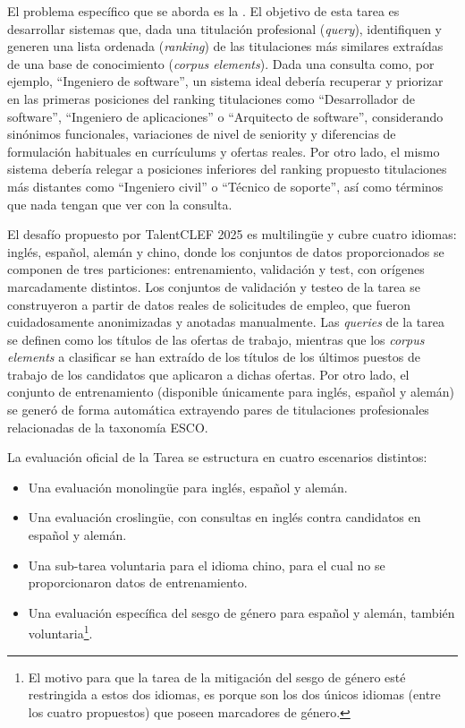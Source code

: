 El problema específico que se aborda es  la . El objetivo de esta tarea es desarrollar sistemas que, dada una titulación profesional (\textit{query}), identifiquen y generen una lista ordenada (\textit{ranking}) de las titulaciones más similares extraídas de una base de conocimiento (\textit{corpus elements}). Dada una consulta como, por ejemplo, ``Ingeniero de software'', un sistema ideal debería recuperar y priorizar en las primeras posiciones del ranking titulaciones como ``Desarrollador de software'', ``Ingeniero de aplicaciones'' o ``Arquitecto de software'', considerando sinónimos funcionales, variaciones de nivel de seniority y diferencias de formulación habituales en currículums y ofertas reales. Por otro lado, el mismo sistema debería relegar a posiciones inferiores del ranking propuesto titulaciones más distantes como ``Ingeniero civil'' o ``Técnico de soporte'', así como términos que nada tengan que ver con la consulta.

El desafío propuesto por TalentCLEF 2025 es multilingüe y cubre cuatro idiomas: inglés, español, alemán y chino, donde los conjuntos de datos proporcionados se componen de tres particiones: entrenamiento, validación y test, con orígenes marcadamente distintos. Los conjuntos de validación y testeo de la tarea se construyeron a partir de datos reales de solicitudes de empleo, que fueron cuidadosamente anonimizadas y anotadas manualmente. Las \textit{queries} de la tarea se definen como los títulos de las ofertas de trabajo, mientras que los \textit{corpus elements} a clasificar se han extraído de los títulos de los últimos puestos de trabajo de los candidatos que aplicaron a dichas ofertas. Por otro lado, el conjunto de entrenamiento (disponible únicamente para inglés, español y alemán) se generó de forma automática extrayendo pares de titulaciones profesionales relacionadas de la taxonomía \gls{ESCO}.

La evaluación oficial de la \gls{Tarea} se estructura en cuatro escenarios distintos:

\begin{itemize}
    \item Una evaluación monolingüe para inglés, español y alemán.
    \item Una evaluación croslingüe, con consultas en inglés contra candidatos en español y alemán.
    \item Una sub-tarea voluntaria para el idioma chino, para el cual no se proporcionaron datos de entrenamiento.
    \item Una evaluación específica del sesgo de género para español y alemán, también voluntaria\footnote{El motivo para que la tarea de la mitigación del sesgo de género esté restringida a estos dos idiomas, es porque son los dos únicos idiomas (entre los cuatro propuestos) que poseen marcadores de género.}.
\end{itemize}

